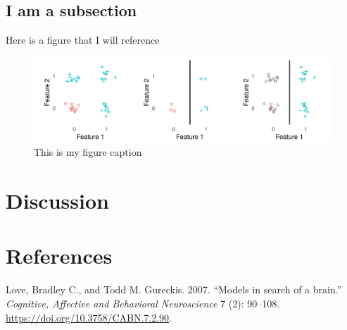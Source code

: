 \documentclass[
]{article}
\begin{document}
\hypertarget{i-am-a-subsection}{%
\subsection{I am a subsection}\label{i-am-a-subsection}}

Here is a figure that I will reference

\begin{figure}
\centering
\includegraphics{figures/learning_trap.pdf}
\caption{This is my figure caption\label{fig:learning_trap}}
\end{figure}

\hypertarget{discussion}{%
\section{Discussion}\label{discussion}}

\hypertarget{references}{%
\section*{References}\label{references}}

\hypertarget{refs}{}
\leavevmode\hypertarget{ref-Love2007}{}%
Love, Bradley C., and Todd M. Gureckis. 2007. ``Models in search of a
brain.'' \emph{Cognitive, Affective and Behavioral Neuroscience} 7 (2):
90--108. \url{https://doi.org/10.3758/CABN.7.2.90}.
\end{document}
